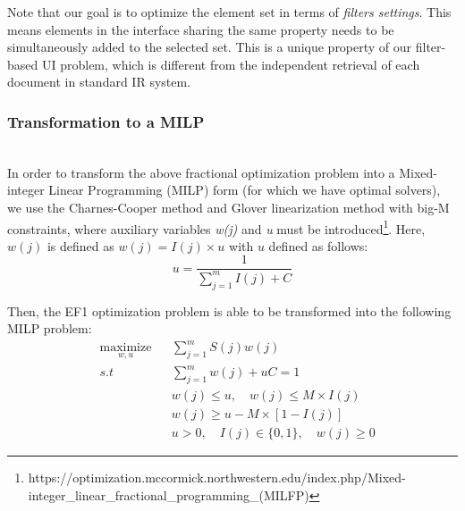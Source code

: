 Note that our goal is to optimize the element set in terms of \emph{filters settings}. This means elements in the interface sharing the same property needs to be simultaneously added to the selected set. This is a unique property of our filter-based UI problem, which is different from the independent retrieval of each document in standard IR system.

\subsubsection{Transformation to a MILP} \hfill \\
In order to transform the above fractional optimization problem into a Mixed-integer Linear Programming (MILP) form (for which we have optimal solvers), we use the Charnes-Cooper method \cite{Charnes1962} and Glover linearization method \cite{Glover1975} with big-M constraints, where auxiliary variables \emph{w(j)} and \emph{u} must be  introduced\footnote{https://optimization.mccormick.northwestern.edu/index.php/Mixed-integer\_linear\_fractional\_programming\_(MILFP)}. Here, $w(j)$ is defined as $w(j)=I(j)\times u$ with $u$ defined as follows:
\begin{equation}
u = \dfrac{1}{\sum_{j=1}^m I(j) + C}
\end{equation}

Then, the EF1 optimization problem is able to be transformed into the following MILP problem:
\begin{equation}
\begin{aligned}
& \underset{w,u}{\text{maximize}}
& & \sum_{j=1}^m S(j)w(j) \\
& s.t
& & \sum_{j=1}^m w(j) + uC = 1 \\
& & & w(j) \leqslant u, \quad w(j) \leqslant M\times I(j)  \\
& & & w(j) \geqslant u - M\times [1-I(j)] \\
& & & u > 0,  \quad I(j) \in \{0, 1\}, \quad w(j) \geqslant 0
\end{aligned}
\end{equation}

